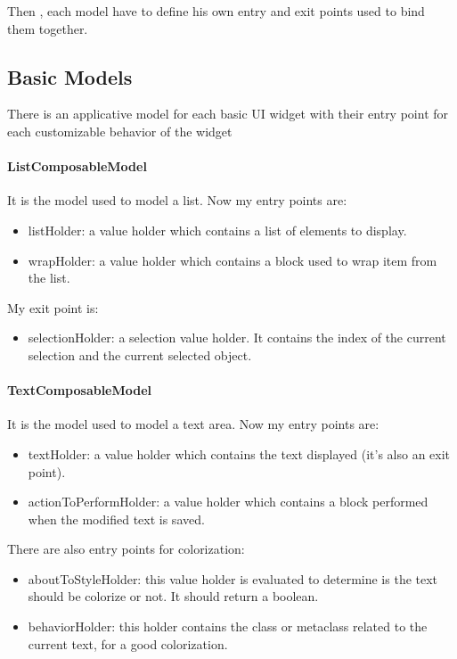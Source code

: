 \documentclass[a4paper,10pt,twoside]{book}
\begin{document}
Then , each model have to define his own entry and exit points used to bind them together.

\subsection{Basic Models}

There is an applicative model for each basic UI widget  with their entry point for each customizable behavior of the widget 

\paragraph{ListComposableModel} It is the model used to model a list.
Now my entry points are:
\begin{itemize}
	\item listHolder: a value holder which contains a list of elements to display.
	\item wrapHolder: a value holder which contains a block used to wrap item from the list.
\end{itemize}
My exit point is:
\begin{itemize}
	\item selectionHolder: a selection value holder. It contains the index of the current selection and the current selected object.
\end{itemize}

\paragraph{TextComposableModel} It is the model used to model a text area.
Now my entry points are:
\begin{itemize}
	\item textHolder: a value holder which contains the text displayed (it's also an exit point).
	\item actionToPerformHolder: a value holder which contains a block performed when the modified text is saved.
\end{itemize}
There are also entry points for colorization:
\begin{itemize}	
	\item aboutToStyleHolder: this value holder is evaluated to determine is the text should be colorize or not. It should return a boolean.
	\item behaviorHolder: this holder contains the class or metaclass related to the current text, for a good colorization.
\end{itemize}
\end{document}
